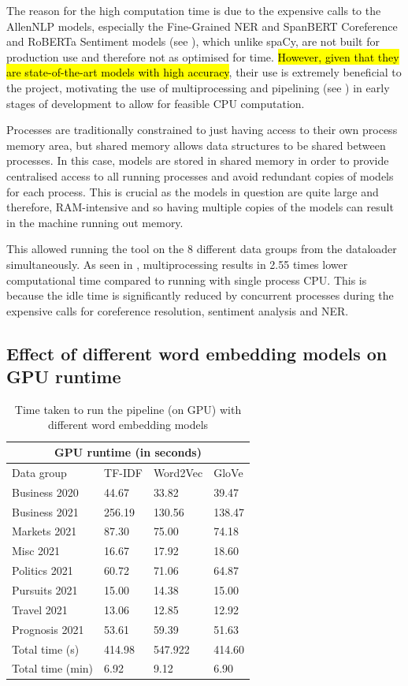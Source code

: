 The reason for the high computation time is due to the expensive calls to the AllenNLP models, especially the Fine-Grained NER and SpanBERT Coreference and RoBERTa Sentiment models (see ), which unlike spaCy, are not built for production use and therefore not as optimised for time. \hl{However, given that they are state-of-the-art models with high accuracy}, their use is extremely beneficial to the project, motivating the use of multiprocessing and pipelining (see ) in early stages of development to allow for feasible CPU computation. 

Processes are traditionally constrained to just having access to their own process memory area, but shared memory allows data structures to be shared between processes. In this case, models are stored in shared memory in order to provide centralised access to all running processes and avoid redundant copies of models for each process. This is crucial as the models in question are quite large and therefore, RAM-intensive and so having multiple copies of the models can result in the machine running out memory. 

This allowed running the tool on the 8 different data groups from the dataloader simultaneously. As seen in , multiprocessing results in 2.55 times lower computational time compared to running with single process CPU. This is because the idle time is significantly reduced by concurrent processes during the expensive calls for coreference resolution, sentiment analysis and NER. 

\subsection{Effect of different word embedding models on GPU runtime}
\vspace{-1ex}
\begin{table}[H]
\centering
\renewcommand{\arraystretch}{1.05}
\begin{tabularx}{0.9\textwidth}{X X X X} 
\multicolumn{4}{c}{GPU runtime (in seconds)} \\
 \hline
 Data group & TF-IDF & Word2Vec & GloVe \\
 \hline
 Business 2020 & 44.67& 33.82& 39.47 \\ 
 Business 2021 & 256.19 & 130.56 & 138.47 \\
 Markets 2021 & 87.30 & 75.00 & 74.18 \\
 Misc 2021 & 16.67 & 17.92 & 18.60 \\
 Politics 2021 & 60.72 & 71.06 & 64.87 \\
 Pursuits 2021 & 15.00 & 14.38 & 15.00 \\ 
 Travel 2021 & 13.06 & 12.85 & 12.92 \\
 Prognosis 2021 & 53.61 & 59.39 & 51.63 \\ 
 \hline
 Total time (s) & 414.98 & 547.922 & 414.60 \\ 
  Total time (min) & 6.92 & 9.12 & 6.90 \\ 
\end{tabularx}
\caption{Time taken to run the pipeline (on GPU) with different word embedding models}
\label{table:word_embed_time}
\end{table}

